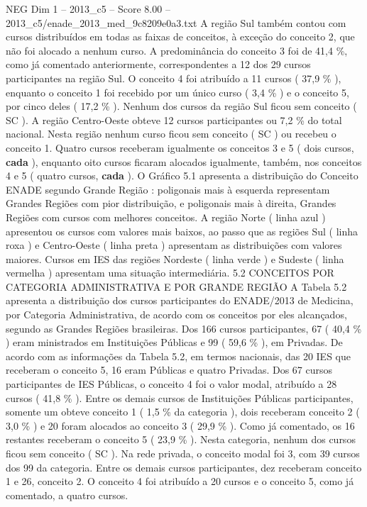 \begin{textsample}{NEG Dim 1 – 2013\_c5 – Score 8.00 – 2013\_c5/enade\_2013\_med\_9c8209e0a3.txt}
A região Sul também contou com cursos distribuídos em todas as faixas de conceitos, à exceção do conceito 2, que não foi alocado a nenhum curso.
A predominância do conceito 3 foi de 41,4 \%, como já comentado anteriormente, correspondentes a 12 dos 29 cursos participantes na região Sul.
O conceito 4 foi atribuído a 11 cursos ( 37,9 \% ), enquanto o conceito 1 foi recebido por um único curso ( 3,4 \% ) e o conceito 5, por cinco deles ( 17,2 \% ).
Nenhum dos cursos da região Sul ficou sem conceito ( SC ).
A região Centro-Oeste obteve 12 cursos participantes ou 7,2 \% do total nacional.
Nesta região nenhum curso ficou sem conceito ( SC ) ou recebeu o conceito 1.
Quatro cursos receberam igualmente os conceitos 3 e 5 ( dois cursos, \textbf{cada} ), enquanto oito cursos ficaram alocados igualmente, também, nos conceitos 4 e 5 ( quatro cursos, \textbf{cada} ).
O Gráfico 5.1 apresenta a distribuição do Conceito ENADE segundo Grande Região : poligonais mais à esquerda representam Grandes Regiões com pior distribuição, e poligonais mais à direita, Grandes Regiões com cursos com melhores conceitos.
A região Norte ( linha azul ) apresentou os cursos com valores mais baixos, ao passo que as regiões Sul ( linha roxa ) e Centro-Oeste ( linha preta ) apresentam as distribuições com valores maiores.
Cursos em IES das regiões Nordeste ( linha verde ) e Sudeste ( linha vermelha ) apresentam uma situação intermediária. 5.2 CONCEITOS POR CATEGORIA ADMINISTRATIVA E POR GRANDE REGIÃO A Tabela 5.2 apresenta a distribuição dos cursos participantes do ENADE/2013 de Medicina, por Categoria Administrativa, de acordo com os conceitos por eles alcançados, segundo as Grandes Regiões brasileiras.
Dos 166 cursos participantes, 67 ( 40,4 \% ) eram ministrados em Instituições Públicas e 99 ( 59,6 \% ), em Privadas.
De acordo com as informações da Tabela 5.2, em termos nacionais, das 20 IES que receberam o conceito 5, 16 eram Públicas e quatro Privadas.
Dos 67 cursos participantes de IES Públicas, o conceito 4 foi o valor modal, atribuído a 28 cursos ( 41,8 \% ).
Entre os demais cursos de Instituições Públicas participantes, somente um obteve conceito 1 ( 1,5 \% da categoria ), dois receberam conceito 2 ( 3,0 \% ) e 20 foram alocados ao conceito 3 ( 29,9 \% ).
Como já comentado, os 16 restantes receberam o conceito 5 ( 23,9 \% ).
Nesta categoria, nenhum dos cursos ficou sem conceito ( SC ).
Na rede privada, o conceito modal foi 3, com 39 cursos dos 99 da categoria.
Entre os demais cursos participantes, dez receberam conceito 1 e 26, conceito 2.
O conceito 4 foi atribuído a 20 cursos e o conceito 5, como já comentado, a quatro cursos.

\end{textsample}
